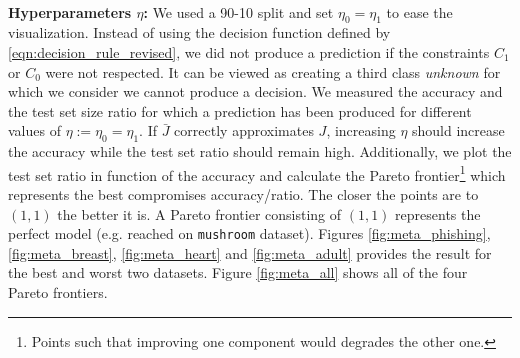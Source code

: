 \documentclass[sigconf,edbt]{acmart-edbt-workshops}
\begin{document}
~\\\noindent
{\bf Hyperparameters $\eta$:} We used a 90-10 split and set $\eta_0 = \eta_1$ to ease the visualization. Instead of using the decision function defined by \eqref{eqn:decision_rule_revised}, we did not produce a prediction if the constraints $C_1$ or $C_0$ were not respected. It can be viewed as creating a third class {\it unknown} for which we consider we cannot produce a decision. We measured the accuracy and the test set size ratio for which a prediction has been produced for different values of $\eta := \eta_0 = \eta_1$. If $\bar J$ correctly approximates $J$, increasing $\eta$ should increase the accuracy while the test set ratio should remain high. Additionally, we plot the test set ratio in function of the accuracy and calculate the Pareto frontier\footnote{Points such that improving one component would degrades the other one.} which represents the best compromises accuracy/ratio. The closer the points are to $(1,1)$ the better it is. A Pareto frontier consisting of $(1,1)$ represents the perfect model (e.g. reached on \texttt{mushroom} dataset). Figures \ref{fig:meta_phishing}, \ref{fig:meta_breast}, \ref{fig:meta_heart} and \ref{fig:meta_adult} provides the result for the best and worst two datasets. Figure \ref{fig:meta_all} shows all of the four Pareto frontiers. 
\end{document}
